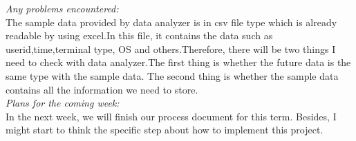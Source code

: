 \noindent\textit{Any problems encountered:}\\
The sample data provided by data analyzer is in csv file type which is already readable by using excel.In this file, it contains the data such as userid,time,terminal type, OS and others.Therefore, there will be two things I need to check with data analyzer.The first thing is whether the future data is the same type with the sample data. The second thing is whether the sample data contains all the information we need to store.\\

\noindent\textit{Plans for the coming week:}\\
In the next week, we will finish our process document for this term. Besides, I might start to think the specific step about how to implement this project.\\
